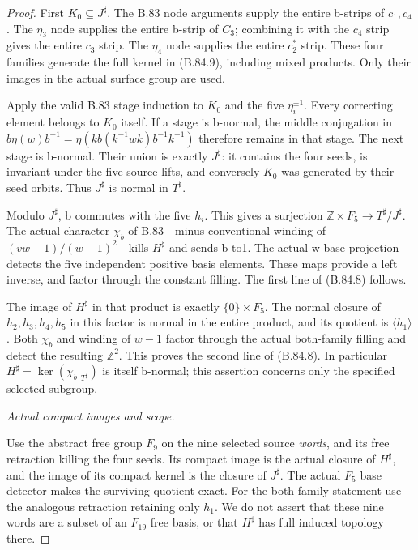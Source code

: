 \begin{proof}
First \(K_0\subseteq J^\sharp\). The B.83 node arguments supply the
entire b-strips of \(c_1,c_4\). The \(\eta_3\) node supplies the
entire b-strip of \(C_3\); combining it with the \(c_4\) strip gives
the entire \(c_3\) strip. The \(\eta_4\) node supplies the entire
\(c_2^*\) strip. These four families generate the full kernel in
(B.84.9), including mixed products. Only their images in the actual
surface group are used.

Apply the valid B.83 stage induction to \(K_0\) and the five
\(\eta_i^{\pm1}\). Every correcting element belongs to \(K_0\)
itself. If a stage is b-normal, the middle conjugation in
\(b\eta(w)b^{-1}=\eta(kb(k^{-1}wk)b^{-1}k^{-1})\)
therefore remains in that stage. The next stage is b-normal.
Their union is exactly \(J^\sharp\): it contains the four seeds,
is invariant under the five source lifts, and conversely \(K_0\)
was generated by their seed orbits. Thus \(J^\sharp\) is normal in
\(T^\sharp\).

Modulo \(J^\sharp\), b commutes with the five \(h_i\). This gives
a surjection \(\mathbb Z\times F_5\to T^\sharp/J^\sharp\).
The actual character \(\chi_b\) of B.83---minus conventional winding
of \((vw-1)/(w-1)^2\)---kills \(H^\sharp\) and sends b to1.
The actual w-base projection detects the five independent positive
basis elements. These maps provide a left inverse, and factor through
the constant filling. The first line of (B.84.8) follows.

The image of \(H^\sharp\) in that product is exactly
\(\{0\}\times F_5\). The normal closure of \(h_2,h_3,h_4,h_5\)
in this factor is normal in the entire product, and its quotient is
\(\langle h_1\rangle\). Both \(\chi_b\) and winding of \(w-1\)
factor through the actual both-family filling and detect the resulting
\(\mathbb Z^2\). This proves the second line of (B.84.8).
In particular \(H^\sharp=\ker(\chi_b|_{T^\sharp})\) is itself
b-normal; this assertion concerns only the specified selected subgroup.

\emph{Actual compact images and scope.}\par\nopagebreak
Use the abstract free group \(F_9\) on the nine selected source
\emph{words}, and its free retraction killing the four seeds.
Its compact image is the actual closure of \(H^\sharp\), and the
image of its compact kernel is the closure of \(J^\sharp\).
The actual \(F_5\) base detector makes the surviving quotient exact.
For the both-family statement use the analogous retraction retaining
only \(h_1\). We do not assert that these nine words are a subset of
an \(F_{19}\) free basis, or that \(H^\sharp\) has full induced
topology there.


\end{proof}
